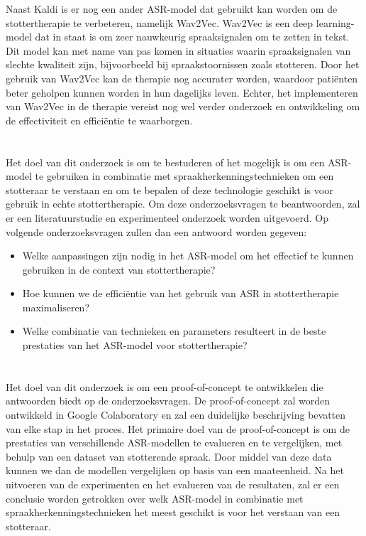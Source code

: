 Naast Kaldi is er nog een ander ASR-model dat gebruikt kan worden om de stottertherapie te verbeteren, namelijk Wav2Vec. Wav2Vec is een deep learning-model dat in staat is om zeer nauwkeurig spraaksignalen om te zetten in tekst. Dit model kan met name van pas komen in situaties waarin spraaksignalen van slechte kwaliteit zijn, bijvoorbeeld bij spraakstoornissen zoals stotteren. Door het gebruik van Wav2Vec kan de therapie nog accurater worden, waardoor patiënten beter geholpen kunnen worden in hun dagelijks leven. Echter, het implementeren van Wav2Vec in de therapie vereist nog wel verder onderzoek en ontwikkeling om de effectiviteit en efficiëntie te waarborgen. 
\section{}%
\label{sec:onderzoeksvraag}
Het doel van dit onderzoek is om te bestuderen of het mogelijk is om een ASR-model te gebruiken in combinatie met spraakherkenningstechnieken om een stotteraar te verstaan en om te bepalen of deze technologie geschikt is voor gebruik in echte stottertherapie. Om deze onderzoeksvragen te beantwoorden, zal er een literatuurstudie en experimenteel onderzoek worden uitgevoerd. Op volgende onderzoeksvragen zullen dan een antwoord worden gegeven:
\begin{itemize}
    \item Welke aanpassingen zijn nodig in het ASR-model om het effectief te kunnen gebruiken in de context van stottertherapie?
    \item Hoe kunnen we de efficiëntie van het gebruik van ASR in stottertherapie maximaliseren?
    \item Welke combinatie van technieken en parameters resulteert in de beste prestaties van het ASR-model voor stottertherapie? 
\end{itemize}

\section{}%
\label{sec:onderzoeksdoelstelling}

Het doel van dit onderzoek is om een proof-of-concept te ontwikkelen die antwoorden biedt op de onderzoeksvragen. De proof-of-concept zal worden ontwikkeld in Google Colaboratory en zal een duidelijke beschrijving bevatten van elke stap in het proces. Het primaire doel van de proof-of-concept is om de prestaties van verschillende ASR-modellen te evalueren en te vergelijken, met behulp van een dataset van stotterende spraak. Door middel van deze data kunnen we dan de modellen vergelijken op basis van een maateenheid. Na het uitvoeren van de experimenten en het evalueren van de resultaten, zal er een conclusie worden getrokken over welk ASR-model in combinatie met spraakherkenningstechnieken het meest geschikt is voor het verstaan van een stotteraar.
